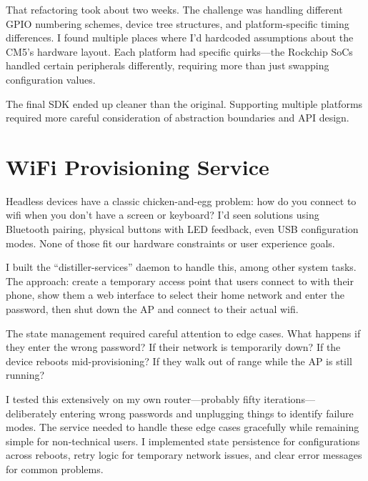 \documentclass[12pt,a4paper]{report}
\begin{document}
That refactoring took about two weeks. The challenge was handling different GPIO numbering schemes, device tree structures, and platform-specific timing differences. I found multiple places where I'd hardcoded assumptions about the CM5's hardware layout. Each platform had specific quirks—the Rockchip SoCs handled certain peripherals differently, requiring more than just swapping configuration values.

\vspace{0.3cm}

The final SDK ended up cleaner than the original. Supporting multiple platforms required more careful consideration of abstraction boundaries and API design.

\section{WiFi Provisioning Service}

Headless devices have a classic chicken-and-egg problem: how do you connect to wifi when you don't have a screen or keyboard? I'd seen solutions using Bluetooth pairing, physical buttons with LED feedback, even USB configuration modes. None of those fit our hardware constraints or user experience goals.

\vspace{0.3cm}

I built the ``distiller-services'' daemon to handle this, among other system tasks. The approach: create a temporary access point that users connect to with their phone, show them a web interface to select their home network and enter the password, then shut down the AP and connect to their actual wifi.

\vspace{0.3cm}

The state management required careful attention to edge cases. What happens if they enter the wrong password? If their network is temporarily down? If the device reboots mid-provisioning? If they walk out of range while the AP is still running?

\vspace{0.3cm}

I tested this extensively on my own router—probably fifty iterations—deliberately entering wrong passwords and unplugging things to identify failure modes. The service needed to handle these edge cases gracefully while remaining simple for non-technical users. I implemented state persistence for configurations across reboots, retry logic for temporary network issues, and clear error messages for common problems.
\end{document}
